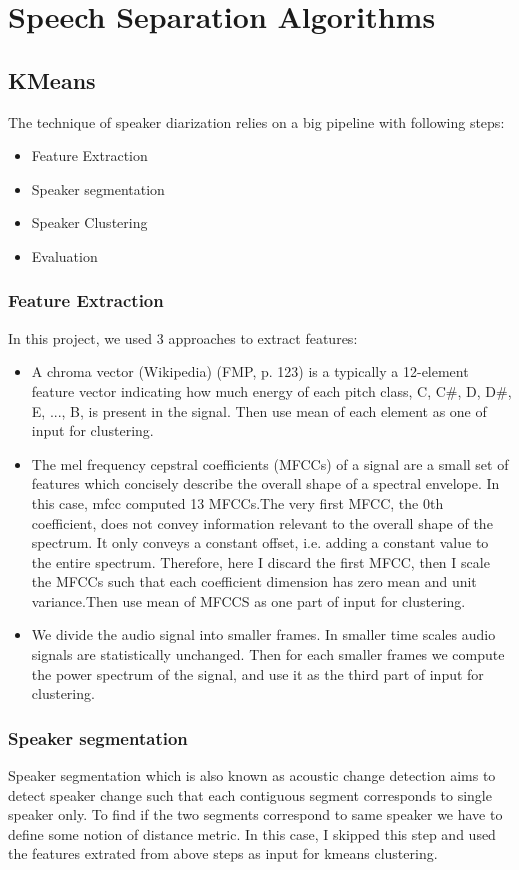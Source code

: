\documentclass[journal, a4paper]{IEEEtran}
\begin{document}
\section{Speech Separation Algorithms}
\subsection{KMeans}
The technique of speaker diarization relies on a big pipeline with following steps:
\begin{itemize}
    \item Feature Extraction
    \item Speaker segmentation
    \item Speaker Clustering
    \item Evaluation
\end{itemize}
\subsubsection{Feature Extraction}
In this project, we used 3 approaches to extract features:
\begin{itemize}
    \item A chroma vector (Wikipedia) (FMP, p. 123) is a typically a 12-element feature vector indicating how much energy of each pitch class, {C, C\#, D, D\#, E, ..., B}, is present in the signal. Then use mean of each element as one of input for clustering.
    \item The mel frequency cepstral coefficients (MFCCs) of a signal are a small set of features  which concisely describe the overall shape of a spectral envelope. In this case, mfcc computed 13 MFCCs.The very first MFCC, the 0th coefficient, does not convey information relevant to the overall shape of the spectrum. It only conveys a constant offset, i.e. adding a constant value to the entire spectrum. Therefore, here I discard the first MFCC, then I scale the MFCCs such that each coefficient dimension has zero mean and unit variance.Then use mean of MFCCS as one part of input for clustering.
    \item We divide the audio signal into smaller frames. In smaller time scales audio signals are statistically unchanged. Then for each smaller frames we compute the power spectrum of the signal, and use it as the third part of input for clustering.
\end{itemize}
\subsubsection{Speaker segmentation}\cite{Segmentation} Speaker segmentation which is also known as acoustic change detection aims to detect speaker change such that each contiguous segment corresponds to single speaker only. To find if the two segments correspond to same speaker we have to define some notion of distance metric. In this case, I skipped this step and used the features extrated from above steps as input for kmeans clustering.
\end{document}
